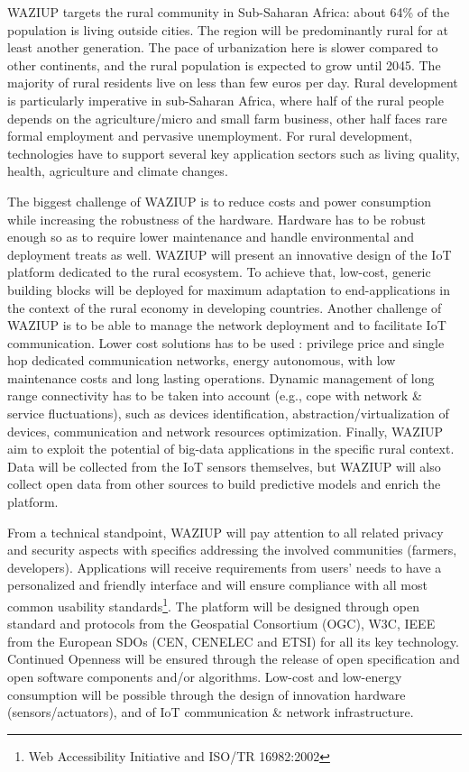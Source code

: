 WAZIUP targets the rural community in Sub-Saharan Africa: about 64\% of the population is living outside cities.
The region will be predominantly rural for at least another generation.
The pace of urbanization here is slower compared to other continents, and the rural population is expected to grow until 2045.
The majority of rural residents live on less than few euros per day.
Rural development is particularly imperative in sub-Saharan Africa, where half of the rural people depends on the agriculture/micro and small farm business, other half faces rare formal employment and pervasive unemployment.
For rural development, technologies have to support several key application sectors such as living quality, health, agriculture and climate changes.

The biggest challenge of WAZIUP is to reduce costs and power consumption while increasing the robustness of the hardware.
Hardware has to be robust enough so as to require lower maintenance and handle environmental and deployment treats as well.
WAZIUP will present an innovative design of the IoT platform dedicated to the rural ecosystem.
To achieve that, low-cost, generic building blocks will be deployed for maximum adaptation to end-applications in the context of the rural economy in developing countries.
Another challenge of WAZIUP is to be able to manage the network deployment and to facilitate IoT communication.
Lower cost solutions has to be used : privilege price and single hop dedicated communication networks, energy autonomous, with low maintenance costs and long lasting operations.
Dynamic management of long range connectivity has to be taken into account (e.g., cope with network \& service fluctuations), such as devices identification, abstraction/virtualization of devices, communication and network resources optimization.
Finally, WAZIUP aim to exploit the potential of big-data applications in the specific rural context.
Data will be collected from the IoT sensors themselves, but WAZIUP will also collect open data from other sources to build predictive models and enrich the platform.

From a technical standpoint, WAZIUP will pay attention to all related privacy and security aspects with specifics addressing the involved communities (farmers, developers).
Applications will receive requirements from users’ needs to have a personalized and friendly interface and will ensure compliance with all most common usability standards\footnote{Web Accessibility Initiative and ISO/TR 16982:2002}.
The platform will be designed through open standard and protocols from the Geospatial Consortium (OGC), W3C, IEEE from the European SDOs (CEN, CENELEC and ETSI) for all its key technology.
Continued Openness will be ensured through the release of open specification and open software components and/or algorithms.
Low-cost and low-energy consumption will be possible through the design of innovation hardware (sensors/actuators), and of IoT communication \& network infrastructure.

